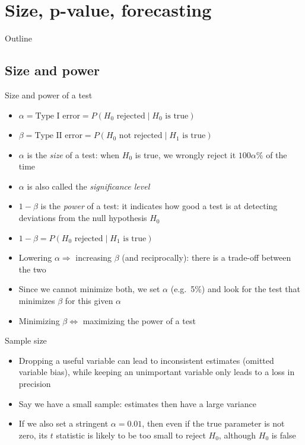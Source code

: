 \documentclass[aspectratio=169]{beamer}
\begin{document}
\section{Size, p-value, forecasting}

\begin{frame}{Outline}
\end{frame}

\subsection{Size and power}

\begin{frame}{Size and power of a test}
\begin{itemize}
    \item $\alpha = \text{Type I error} = P(H_0 \text{ rejected} \mid H_0 \text{ is true})$
    \item $\beta = \text{Type II error} = P(H_0 \text{ not rejected} \mid H_1 \text{ is true})$
    \item $\alpha$ is the \textit{size} of a test: when $H_0$ is true, we wrongly reject it $100\alpha\%$ of the time
    \item $\alpha$ is also called the \textit{significance level}
    \item $1 - \beta$ is the \textit{power} of a test: it indicates how good a test is at detecting deviations from the null hypothesis $H_0$
    \item $1 - \beta = P(H_0 \text{ rejected} \mid H_1 \text{ is true})$
    \item Lowering $\alpha \Rightarrow$ increasing $\beta$ (and reciprocally): there is a trade-off between the two
    \item Since we cannot minimize both, we set $\alpha$ (e.g.\ 5\%) and look for the test that minimizes $\beta$ for this given $\alpha$
    \item Minimizing $\beta \Leftrightarrow$ maximizing the power of a test
\end{itemize}
\end{frame}

\begin{frame}{Sample size}
\begin{itemize}
    \item Dropping a useful variable can lead to inconsistent estimates (omitted variable bias), while keeping an unimportant variable only leads to a loss in precision
    \item Say we have a small sample: estimates then have a large variance
    \item If we also set a stringent $\alpha = 0.01$, then even if the true parameter is not zero, its $t$ statistic is likely to be too small to reject $H_0$, although $H_0$ is false
\end{itemize}
\end{frame}
\end{document}
